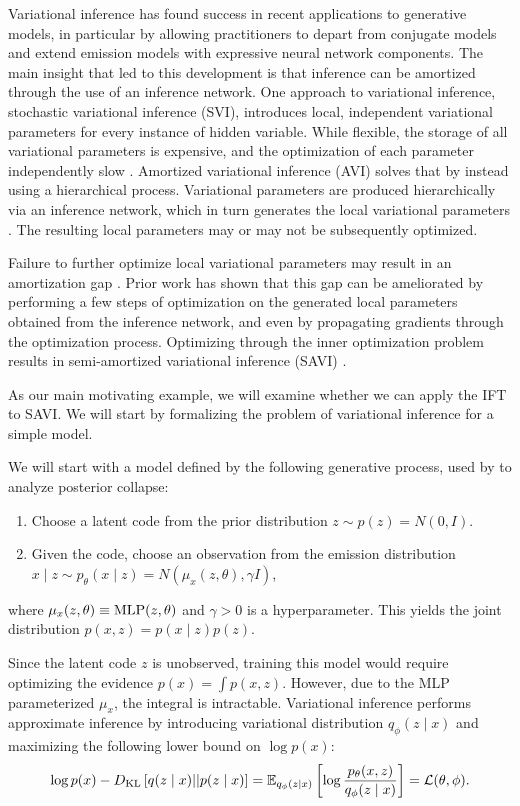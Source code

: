\documentclass[11pt]{article}
\begin{document}
Variational inference has found success in recent applications to generative models,
in particular by allowing practitioners to depart from conjugate models
and extend emission models with expressive neural network components.
The main insight that led to this development is that inference can be amortized through
the use of an inference network.
One approach to variational inference, stochastic variational inference (SVI),
introduces local, independent variational parameters for every instance of hidden variable.
While flexible, the storage of all variational parameters is expensive, and the optimization
of each parameter independently slow \citep{}.
Amortized variational inference (AVI) solves that by instead using a hierarchical process.
Variational parameters are produced hierarchically via an inference network,
which in turn generates the local variational parameters \citep{}.
The resulting local parameters may or may not be subsequently optimized.

Failure to further optimize local variational parameters may result in an amortization gap \citep{}.
Prior work has shown that this gap can be ameliorated by performing a few steps of
optimization on the generated local parameters obtained from the inference network,
and even by propagating gradients through the optimization process.
Optimizing through the inner optimization problem results in semi-amortized variational inference
(SAVI) \citep{}.

As our main motivating example, we will examine whether we can apply the IFT to SAVI.
We will start by formalizing the problem of variational inference for a simple model.

We will start with a model defined by the following generative process,
used by \citet{dai2020vae} to analyze posterior collapse:
\begin{enumerate}
\item Choose a latent code from the prior distribution $z \sim p(z) = N(0, I)$.
\item Given the code, choose an observation from the emission distribution
    $x \mid z \sim p_\theta(x \mid z) = N(\mu_x(z, \theta), \gamma I)$,
\end{enumerate}
where $\mu_x(z, \theta) \equiv \mathrm{MLP}(z, \theta)$ and $\gamma > 0$ is a hyperparameter.
This yields the joint distribution $p(x,z) = p(x\mid z)p(z)$.

Since the latent code $z$ is unobserved, training this model would require optimizing the
evidence $p(x) = \int p(x,z)$.
However, due to the MLP parameterized $\mu_x$, the integral is intractable.
Variational inference performs approximate inference by introducing variational distribution
$q_\phi(z \mid x)$ and maximizing the following lower bound on $\log p(x)$:
\begin{equation}
    \log p(x) - D_\mathrm{KL}\left[q(z \mid x) || p(z \mid x)\right]
    = \mathbb{E}_{q_\phi(z \mid x)}\left[\log \frac{p_\theta(x,z)}{q_\phi(z\mid x)}\right] = \mathcal{L}(\theta, \phi).
\end{equation}
\end{document}
